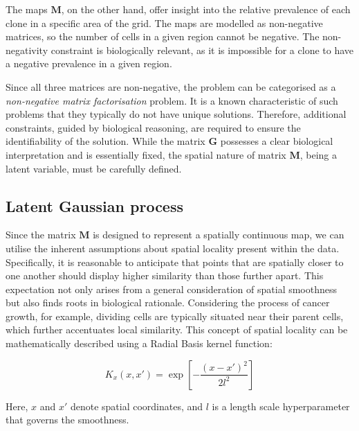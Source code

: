 The maps $\mathbf{M}$, on the other hand, offer insight into the relative prevalence of each clone in a specific area of the grid. The maps are modelled as non-negative matrices, so the number of cells in a given region cannot be negative. The non-negativity constraint is biologically relevant, as it is impossible for a clone to have a negative prevalence in a given region.

Since all three matrices are non-negative, the problem can be categorised as a \emph{non-negative matrix factorisation} problem. It is a known characteristic of such problems that they typically do not have unique solutions. Therefore, additional constraints, guided by biological reasoning, are required to ensure the identifiability of the solution. While the matrix $\mathbf{G}$ possesses a clear biological interpretation and is essentially fixed, the spatial nature of matrix $\mathbf{M}$, being a latent variable, must be carefully defined.

\subsection{Latent Gaussian process}


Since the matrix $\mathbf{M}$ is designed to represent a spatially continuous map, we can utilise the inherent assumptions about spatial locality present within the data. Specifically, it is reasonable to anticipate that points that are spatially closer to one another should display higher similarity than those further apart. This expectation not only arises from a general consideration of spatial smoothness but also finds roots in biological rationale. Considering the process of cancer growth, for example, dividing cells are typically situated near their parent cells, which further accentuates local similarity. This concept of spatial locality can be mathematically described using a Radial Basis kernel function:

\begin{equation}
    K_x(x,x') = \exp\left[ -\dfrac{(x-x')^2}{2l^2}\right]
\end{equation}

Here, $x$ and $x'$ denote spatial coordinates, and $l$ is a length scale hyperparameter that governs the smoothness.

